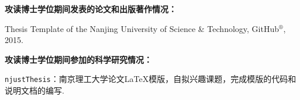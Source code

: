 \begin{publications}{99}
\item[] {\bf{攻读博士学位期间发表的论文和出版著作情况：}}

\item Thesis Template of the Nanjing University of Science \& Technology, GitHub$^{\circledR}$, 2015.

\vspace{1.0cm}
\item[] {{\songti{}\bf{攻读博士学位期间参加的科学研究情况：}}}
\setcounter{enumiv}{0}

\item \texttt{njustThesis}：南京理工大学论文\LaTeX{}模版，自拟兴趣课题，完成模版的代码和说明文档的编写.


\end{publications}
